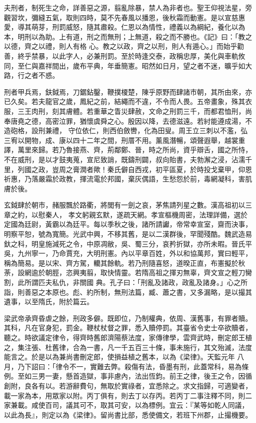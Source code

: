 
\begin{pinyinscope}

 夫刑者，制死生之命，詳善惡之源，翦亂除暴，禁人為非者也。聖王仰視法星，旁觀習坎，彌縫五氣，取則四時，莫不先春風以播恩，後秋霜而動憲。是以宣慈惠愛，導其萌芽，刑罰威怒，隨其肅殺。仁恩以為情性，禮義以為綱紀，養化以為本，明刑以為助。上有道，刑之而無刑；上無道，殺之而不勝也。《記》曰：「教之以德，齊之以禮，則人有格
 心。教之以政，齊之以刑，則人有遁心。」而始乎勸善，終乎禁暴，以此字人，必兼刑罰。至於時逢交泰，政稱忠厚，美化與車軌攸同，至仁與嘉祥間出，歲布平典，年垂簡憲。昭然如日月，望之者不迷，曠乎如大路，行之者不惑。



 刑者甲兵焉，鈇鉞焉，刀鋸鉆鑿，鞭撲榎楚，陳乎原野而肆諸市朝，其所由來，亦已久矣。若夫龍官之歲，鳳紀之前，結繩而不違，不令而人畏。五帝畫象，殊其衣服，三王肉刑，刻其膚體。若重華之眚災肆赦，文命之刑罰三千，而都君恤刑，尚奉唐堯之德，高密泣罪，猶懷虞舜之心。殷因以降，去德滋遠。若紂能遵成湯，不造砲格，設刑兼禮，
 守位依仁，則西伯斂轡，化為田叟。周王立三刺以不濫，弘三宥以開物，成、康以四十二年之間，刑厝不用。薰風潛暢，頌聲遐舉，越裳重譯，萬里來歸。若乃魯接燕、齊，荊鄰鄭、晉，時之所尚，資乎辯舌，國之所恃，不在威刑，是以才鼓夷蒐，宣尼致誚，既鑄刑闢，叔向貽書，夫勃澥之浸，沾濡千里，列國之政，豈周之膏潤者歟！秦氏僻自西戎，初平區夏，於時投戈棄甲，仰恩祈惠，乃落嚴霜於政教，揮流電於邦國，棄灰偶語，生愁怨於前，毒網凝科，害肌膚於後。



 玄鉞肆於朝市，赭服飄於路衢，將閭有一劍之哀，茅焦請列星之數。漢高祖初以三章之約，以慰秦人，
 孝文躬親玄默，遂疏天網。孝宣樞機周密，法理詳備，選於定國為廷尉，黃霸以為廷平。每以季秋之後，諸所請讞，帝常幸宣室，齋而決事，明察平恕，號為寬簡。光武中興，不移其舊，是以二漢群後，罕聞殘酷。魏武造易釱之科，明皇施減死之令，中原凋敝，吳、蜀三分，哀矜折獄，亦所未暇。晉氏平吳，九州寧一，乃命賈充，大明刑憲。內以平章百姓，外以和協萬邦，實曰輕平，稱為簡易。是以宋、齊方駕，轥其餘軌。若乃刑隨喜怒，道暌正直，布憲擬於秋荼，設網逾於朝脛，恣興夷翦，取快情靈。若隋高祖之揮刃無辜，齊文宣之輕刀臠割，此所謂匹夫私仇，非關國
 典。孔子曰：「刑亂及諸政，政亂及諸身。」心之所詣，則善惡之本原也。彪、約所制，無刑法篇，臧、蕭之書，又多漏略，是以撮其遺事，以至隋氏，附於篇云。



 梁武帝承齊昏虐之餘，刑政多僻。既即位，乃制權典，依周、漢舊事，有罪者贖。其科，凡在官身犯，罰金。鞭杖杖督之罪，悉入贖停罰。其臺省令史士卒欲贖者，聽之。時欲議定律令，得齊時舊郎濟陽蔡法度，家傳律學，雲齊武時，刪定郎王植之，集注張、杜舊律，合為一書，凡一千五百三十條，事未施行，其文殆滅，法度能言之。於是以為兼尚書刪定郎，使損益植之舊本，以為《梁律》。天監元年
 八月，乃下詔曰：「律令不一，實難去弊。殺傷有法，昏墨有刑，此蓋常科，易為條例。至如三男一妻，懸首造獄，事非慮內，法出恆鈞。前王之律，後王之令，因循創附，良各有以。若游辭費句，無取於實祿者，宜悉除之。求文指歸，可適變者，載一家為本，用眾家以附。丙丁俱有，則去丁以存丙。若丙丁二事注釋不同，則二家兼載。咸使百司，議其可不，取其可安，以為標例。宜云：『某等如乾人同議，以此為長』，則定以為《梁律》。留尚書比部，悉使備文，若班下州郡，止撮機要。




\end{pinyinscope}
